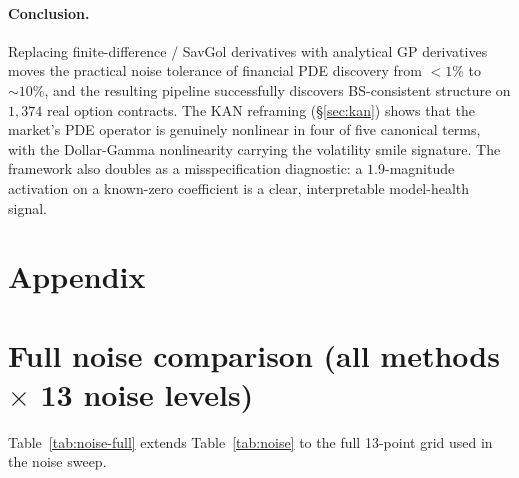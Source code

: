 \documentclass[10pt]{article}
\begin{document}
\paragraph{Conclusion.} Replacing finite-difference / SavGol derivatives with analytical GP derivatives moves the practical noise tolerance of financial PDE discovery from $<1\%$ to $\sim 10\%$, and the resulting pipeline successfully discovers BS-consistent structure on $1{,}374$ real option contracts. The KAN reframing (\S\ref{sec:kan}) shows that the market's PDE operator is genuinely nonlinear in four of five canonical terms, with the Dollar-Gamma nonlinearity carrying the volatility smile signature. The framework also doubles as a misspecification diagnostic: a $1.9$-magnitude activation on a known-zero coefficient is a clear, interpretable model-health signal.




\appendix
\clearpage
\section*{Appendix}

\section{Full noise comparison (all methods $\times$ 13 noise levels)}\label{app:noise}
Table~\ref{tab:noise-full} extends Table~\ref{tab:noise} to the full 13-point grid used in the noise sweep.
\end{document}
